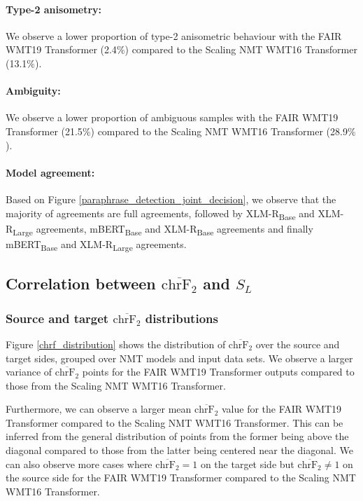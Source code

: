 \documentclass[11pt,a4paper]{article}
\begin{document}
\paragraph{Type-2 anisometry:} We observe a lower proportion of type-2 anisometric behaviour with the FAIR WMT19 Transformer (2.4$\%$) compared to the Scaling NMT WMT16 Transformer (13.1$\%$).  
\paragraph{Ambiguity:} We observe a lower proportion of ambiguous samples with the FAIR WMT19 Transformer (21.5$\%$) compared to the Scaling NMT WMT16 Transformer (28.9$\%$).
\paragraph{Model agreement:} Based on Figure \ref{paraphrase_detection_joint_decision}, we observe that the majority of agreements are full agreements, followed by XLM-R\textsubscript{Base} and XLM-R\textsubscript{Large} agreements, mBERT\textsubscript{Base} and XLM-R\textsubscript{Base} agreements and finally mBERT\textsubscript{Base} and XLM-R\textsubscript{Large} agreements.

\subsection{Correlation between $\overline{\text{chrF}_2}$ and $S_L$}

\subsubsection{Source and target $\overline{\text{chrF}_2}$ distributions}

Figure \ref{chrf_distribution} shows the distribution of $\overline{\text{chrF}_2}$ over the source and target sides, grouped over NMT models and input data sets. We observe a larger variance of $\overline{\text{chrF}_2}$ points for the FAIR WMT19 Transformer outputs compared to those from the Scaling NMT WMT16 Transformer.

Furthermore, we can observe a larger mean $\overline{\text{chrF}_2}$ value for the FAIR WMT19 Transformer compared to the Scaling NMT WMT16 Transformer. This can be inferred from the general distribution of points from the former being above the diagonal compared to those from the latter being centered near the diagonal. We can also observe more cases where $\overline{\text{chrF}_2} = 1$ on the target side but $\overline{\text{chrF}_2} \neq 1$ on the source side for the FAIR WMT19 Transformer compared to the Scaling NMT WMT16 Transformer. 
\end{document}
